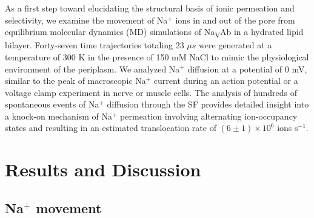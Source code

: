 \begin{refsection}
As a first step toward elucidating the structural basis of ionic permeation and selectivity, we examine the movement of Na$^+$ ions in and out of the pore from equilibrium molecular dynamics (MD) simulations of Na\textsubscript{V}Ab in a hydrated lipid bilayer.  Forty-seven time trajectories totaling 23 $\mu s$ were generated at a temperature of 300 K in the presence of 150 mM NaCl to mimic the physiological environment of the periplasm.  We analyzed Na$^+$ diffusion at a potential of 0 mV, similar to the peak of macroscopic Na$^+$ current during an action potential or a voltage clamp experiment in nerve or muscle cells. The analysis of hundreds of spontaneous events of Na$^+$ diffusion through the SF provides detailed insight into a knock-on mechanism of Na$^+$ permeation involving alternating ion-occupancy states and resulting in an estimated translocation rate of $(6 \pm 1)\times10^{6}$ ions s$^{-1}$. \cite{Payandeh:2012ib}

\section{Results and Discussion}

\subsection{Na$^+$ movement}


\end{refsection}
